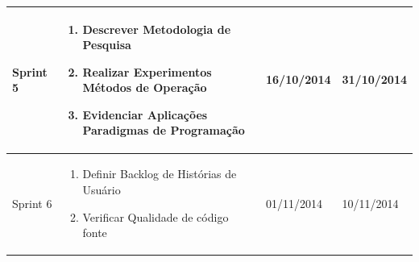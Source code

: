 \begin{table}
\begin{center}
\begin{tabular}{  | p{2cm} | p{8cm} | p{2cm}| p{2cm} |}
    Sprint 5 & \begin{enumerate}
    \item Descrever Metodologia de Pesquisa
    \item Realizar Experimentos Métodos de Operação
    \item Evidenciar Aplicações Paradigmas de Programação
    \end{enumerate} & 16/10/2014 & 31/10/2014\\ \hline
    
    Sprint 6 & \begin{enumerate}
    \item Definir Backlog de Histórias de Usuário
    \item Verificar Qualidade de código fonte
    \end{enumerate} & 01/11/2014 & 10/11/2014\\ \hline
    \end{tabular}    
\end{center}
\label{cronograma}
\end{table}
